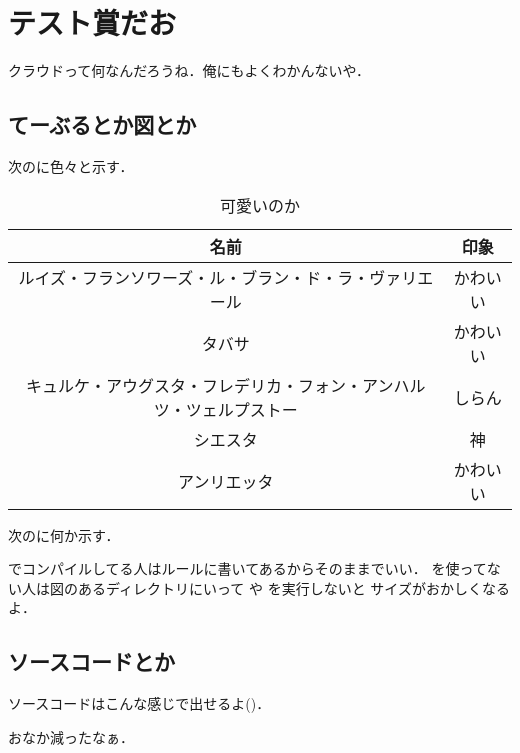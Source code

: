 
\section{テスト賞だお}
クラウドって何なんだろうね．俺にもよくわかんないや．

\subsection*{てーぶるとか図とか}
次のに色々と示す．

\begin{table}[tbh]
	\caption{可愛いのか} \label{tab:example}
	\begin{center}
		\begin{tabular}[htb]{c|c}
		\hline
		名前 & 印象 \\
		\hline
		ルイズ・フランソワーズ・ル・ブラン・ド・ラ・ヴァリエール & かわいい \\ \hline
		タバサ & かわいい \\ \hline
		キュルケ・アウグスタ・フレデリカ・フォン・アンハルツ・ツェルプストー & しらん \\ \hline
		シエスタ & 神 \\ \hline
		アンリエッタ & かわいい \\ \hline
		\end{tabular}
	\end{center}
\end{table}

次のに何か示す．


でコンパイルしてる人はルールに書いてあるからそのままでいい．
を使ってない人は図のあるディレクトリにいって  や  を実行しないと
サイズがおかしくなるよ．


\ifSRC
	\subsection*{ソースコードとか}
	ソースコードはこんな感じで出せるよ()．

\fi

おなか減ったなぁ．

